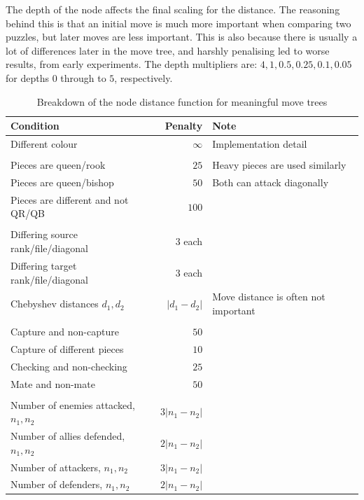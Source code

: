 The depth of the node affects the final scaling for the distance. The reasoning
behind this is that an initial move is much more important when comparing two
puzzles, but later moves are less important. This is also because there is
usually a lot of differences later in the move tree, and harshly penalising led
to worse results, from early experiments. The depth multipliers are: $4, 1,
0.5, 0.25, 0.1, 0.05$ for depths $0$ through to $5$, respectively.

\begin{table}[H]
  \centering
  \begin{tabular}{lrl}
    Condition & Penalty & Note \\
    \hline
    Different colour & $\infty$ & Implementation detail \\
    &&\\
    Pieces are queen/rook & $25$ & Heavy pieces are used similarly \\
    Pieces are queen/bishop& $50$ & Both can attack diagonally \\
    Pieces are different and not QR/QB& $100$ & \\
    &&\\
    Differing source rank/file/diagonal & $3$ each & \\
    Differing target rank/file/diagonal & $3$ each & \\
    Chebyshev distances $d_1, d_2$ & $|d_1-d_2|$ & Move distance is often
    not important \\
    &&\\
    Capture and non-capture & $50$ & \\
    Capture of different pieces & $10$ & \\
    Checking and non-checking & $25$ & \\
    Mate and non-mate & $50$ & \\
    &&\\
    Number of enemies attacked, $n_1, n_2$ & $3|n_1-n_2|$ & \\
    Number of allies defended, $n_1, n_2$ & $2|n_1-n_2|$ & \\
    Number of attackers, $n_1, n_2$ & $3|n_1-n_2|$ & \\
    Number of defenders, $n_1, n_2$ & $2|n_1-n_2|$ & \\
  \end{tabular}
  \caption{Breakdown of the node distance function for meaningful move trees}
  \label{distanceTable}
\end{table}

